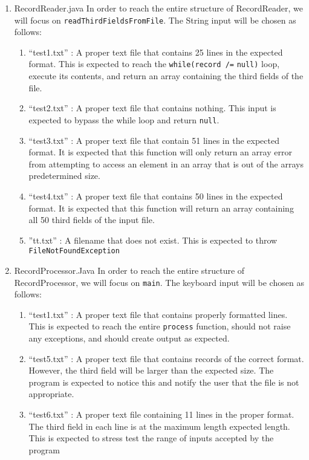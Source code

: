 \documentclass[]{article}
\begin{document}
\begin{enumerate}
  \item RecordReader.java \break
	In order to reach the entire structure of RecordReader, we will focus on
	\verb!readThirdFieldsFromFile!.  The String input will be
	chosen as follows: \begin{enumerate}
  					\item ``test1.txt'' : A proper text file that contains 25 lines in the
  					expected format.  This is expected to reach the \verb!while(record /=!
  					\verb!null)! loop, execute its contents, and return an array containing
  					the third fields of the file.
  					\item ``test2.txt'' : A proper text file that contains nothing.  This
  					input is expected to bypass the while loop and return \verb!null!.  
  					\item ``test3.txt'' : A proper text file that contain 51 lines in the
  					expected format.  It is expected that this function will only return an
  					array error from attempting to access an element in an array that is out
  					of the arrays predetermined size.
  					\item ``test4.txt'' : A proper text file that contains 50 lines in the
  					expected format.  It is expected that this function will return an array
  					containing all 50 third fields of the input file.
  					\item ''tt.txt'' : A filename that does not exist.  This is expected to
  					throw \verb!FileNotFoundException!
					\end{enumerate}
  \item RecordProcessor.Java \break
	In order to reach the entire structure of RecordProcessor, we will focus on
	\verb!main!.  The keyboard input will be
	chosen as follows: \begin{enumerate}
  					\item ``test1.txt'' : A proper text file that contains properly formatted
  					lines.  This is expected to reach the entire \verb!process! function,
  					should not raise any exceptions, and should create output as expected.
  					\item ``test5.txt'' : A proper text file that contains records of the
  					correct format.  However, the third field will be larger than the
  					expected size.  The program is expected to notice this and notify the
  					user that the file is not appropriate.
  					\item  ``test6.txt'' : A proper text file containing 11 lines in the
  					proper format.  The third field in each line is at the maximum length
  					expected length.  This is expected to stress test the range of inputs
  					accepted by the program
					\end{enumerate}
\end{enumerate}
\end{document}

